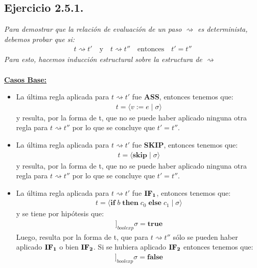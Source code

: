 \documentclass[a4paper,10pt]{article}
\begin{document}
\subsection*{Ejercicio 2.5.1.}
	\emph{Para demostrar que la relación de evaluación de un paso $\rightsquigarrow$ es determinista, debemos probar que si:
	\begin{align*} 
		t \rightsquigarrow t'  \quad \text{y} \quad 
		t \rightsquigarrow t'' \quad \text{entonces}  
		\quad t' = t'' 
	\end{align*}
	Para esto, hacemos inducción estructural sobre la estructura de $\rightsquigarrow$}
	\\
	\\
	\underline{\bf Casos Base:}
	\begin{itemize}
		\item La última regla aplicada para $t \rightsquigarrow t'$ fue {\bf ASS}, entonces tenemos que:
				\begin{align*} t = \langle v:=e \;|\; \sigma\rangle \end{align*}
			y resulta, por la forma de t, que no se puede haber aplicado ninguna otra regla para $t \rightsquigarrow t''$ por lo que se concluye que $t'= t''$.
			\\
		\item La última regla aplicada para $t \rightsquigarrow t'$ fue {\bf SKIP}, entonces tenemos que:
				\begin{align*} t = \langle \textbf{skip} \;|\; \sigma\rangle \end{align*}
			y resulta, por la forma de t, que no se puede haber aplicado ninguna otra regla para $t \rightsquigarrow t''$ por lo que se concluye que $t'= t''$.
			\\
		\item La última regla aplicada para $t \rightsquigarrow t'$ fue ${\bf IF_{1}}$, entonces tenemos que:
				\begin{align*} t = \langle \textbf{if}\; b \;\textbf{then}\; c_{0} \;\textbf{else}\; c_{1} \;|\; \sigma\rangle \end{align*}
			y se tiene por hipótesis que: 
				\begin{align*} [\![b]\!]_{boolexp}\sigma = \textbf{true} \end{align*}
			Luego, resulta por la forma de t, que para $t \rightsquigarrow t''$ sólo se pueden haber aplicado ${\bf IF_{1}}$ o bien ${\bf IF_{2}}$.
			Si se hubiera aplicado ${\bf IF_{2}}$ entonces tenemos que:
				\begin{align*} [\![b]\!]_{boolexp}\sigma = \textbf{false} \end{align*}

\end{itemize}
\end{document}
